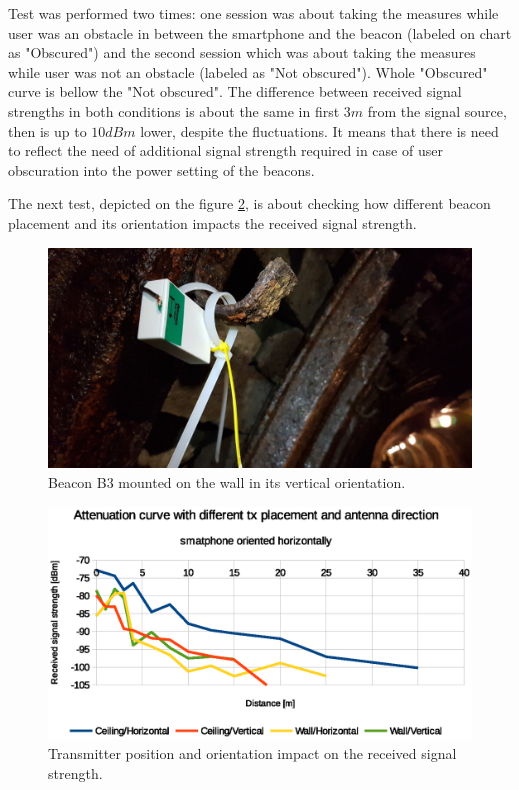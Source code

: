 \documentclass[../main.tex]{subfiles}
\begin{document}
Test was performed two times: one session was about taking the measures while user was an obstacle in between the smartphone and the beacon (labeled on chart as "Obscured") and the second session which was about taking the measures while user was not an obstacle (labeled as "Not obscured"). Whole "Obscured" curve is bellow the "Not obscured". The difference between received signal strengths in both conditions is about the same in first $3m$ from the signal source, then is up to $10 dBm$ lower, despite the fluctuations. It means that there is need to reflect the need of additional signal strength required in case of user obscuration into the power setting of the beacons.

The next test, depicted on the figure \ref{fig:tests_case6_tx_placement_and_direction},  is about checking how different beacon placement and its orientation impacts the received signal strength.

\begin{figure}[!htbp]
\includegraphics[width=\textwidth, keepaspectratio]{pictures/beacon_wall_vertical.pdf}
\centering
\caption{Beacon B3 mounted on the wall in its vertical orientation.}
\label{fig:beacon_wall_vertical}
\end{figure}

\begin{figure}[!htbp]
\includegraphics[width=\textwidth, keepaspectratio]{pictures/tests_case6_tx_placement_and_direction}
\centering
\caption{Transmitter position and orientation impact on the received signal strength.}
\label{fig:tests_case6_tx_placement_and_direction}
\end{figure}
\end{document}
